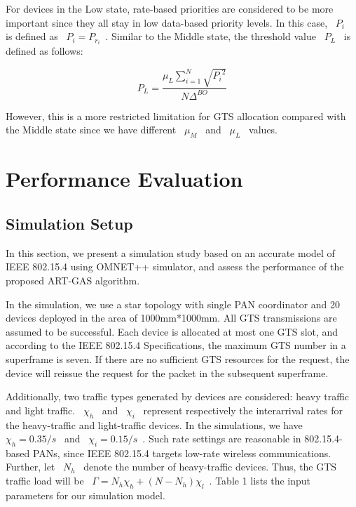 \documentclass[letterpaper]{sig-alternate-10pt}
\begin{document}
For devices in the Low state, rate-based priorities are considered to be more important since they all stay in low data-based priority levels. In this case, ~$P_i$~ is defined as ~${P_i} = {P_{{r_i}}}$~. Similar to the Middle state, the threshold value ~$P_L$~ is defined as follows:

\begin{equation}{P_L} = \frac{{{\mu _L}\sum\limits_{i = 1}^N {\sqrt {{P_i}^2} } }}{{N{\Delta ^{BO}}}}\end{equation}

However, this is a more restricted limitation for GTS allocation compared with the Middle state since we have different ~${\mu _M}$~ and ~${\mu _L}$~ values.

\section{Performance Evaluation}
\subsection{Simulation Setup}
In this section, we present a simulation study based on an accurate model of IEEE 802.15.4 using OMNET++ simulator, and assess the performance of the proposed ART-GAS algorithm.

In the simulation, we use a star topology with single PAN coordinator and 20 devices deployed in the area of 1000mm*1000mm. All GTS transmissions are assumed to be successful. Each device is allocated at most one GTS slot, and according to the IEEE 802.15.4 Specifications, the maximum GTS number in a superframe is seven. If there are no sufficient GTS resources for the request, the device will reissue the request for the packet in the subsequent superframe.

Additionally, two traffic types generated by devices are considered: heavy traffic and light traffic. ~${\chi _h}$~ and ~${\chi _i}$~ represent respectively the interarrival rates for the heavy-traffic and light-traffic devices. In the simulations, we have ~${\chi _h} = 0.35/s$~ and ~${\chi _i} = 0.15/s$~. Such rate settings are reasonable in 802.15.4-based PANs, since IEEE 802.15.4 targets low-rate wireless communications. Further, let ~$N_h$~ denote the number of heavy-traffic devices. Thus, the GTS traffic load will be ~$\Gamma  = {N_h}{\chi _h} + (N - {N_h}){\chi _l}$~. Table 1 lists the input parameters for our simulation model.
\end{document}
